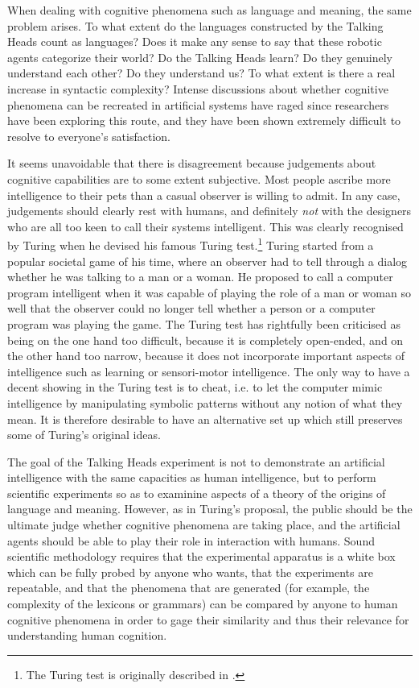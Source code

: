 When dealing with cognitive phenomena such as language
and meaning, the same problem arises. To what extent
do the languages constructed by the Talking Heads count
as languages? Does it make any sense to say that these robotic 
agents categorize their world? Do the Talking
Heads learn? Do they genuinely understand each other? Do they 
understand us? To what extent 
is there a real increase in syntactic 
complexity? Intense discussions about whether cognitive phenomena can 
be recreated in artificial systems 
have raged since researchers have been exploring this 
route, and they have been shown extremely difficult to resolve to 
everyone's satisfaction. 

It seems unavoidable that there is disagreement because 
judgements about cognitive capabilities are to some 
extent subjective. Most people ascribe more intelligence
to their pets than a casual observer is willing to admit. 
In any case, judgements should clearly rest with humans, and
definitely {\it not} with the designers 
who are all too keen to call their systems intelligent. 
This was clearly recognised by Turing  when he devised
his famous Turing test.\footnote{The Turing test is originally described in 
\cite{Turing:1950}.} Turing started from a popular societal 
game of his time, where an observer had to tell through
a dialog whether he was talking to a man or a woman. 
He proposed to call a computer program intelligent when 
it was capable of playing the role of a man or woman
so well that the observer could no longer tell whether
a person or a computer program was playing the game. 
The Turing test has rightfully been criticised as being
on the one hand too difficult, because it is completely 
open-ended, and on the other hand too narrow, because it 
does not incorporate important aspects of intelligence such 
as learning or sensori-motor intelligence. The only way 
to have a decent showing in the Turing test is to
cheat, i.e. to let the computer mimic intelligence 
by manipulating symbolic patterns without any notion of what 
they mean. It is therefore desirable to have an alternative
set up which still preserves some of Turing's original 
ideas. 

The goal of the Talking Heads experiment is not to demonstrate 
an artificial intelligence with the same capacities as 
human intelligence, but to perform
scientific experiments so as to examinine aspects 
of a theory of the origins of language and meaning. 
However, as in Turing's proposal, the public should be 
the ultimate judge whether cognitive phenomena are taking
place, and the artificial agents should be able to play their role
in interaction with humans. 
Sound scientific methodology requires that 
the experimental apparatus is a white box which can be fully probed 
by anyone who wants, that the experiments are repeatable, 
and that the phenomena that are generated 
(for example, the complexity of the lexicons or 
grammars) can be 
compared by anyone to human cognitive phenomena in order to gage 
their similarity and thus their relevance for understanding
human cognition. 

